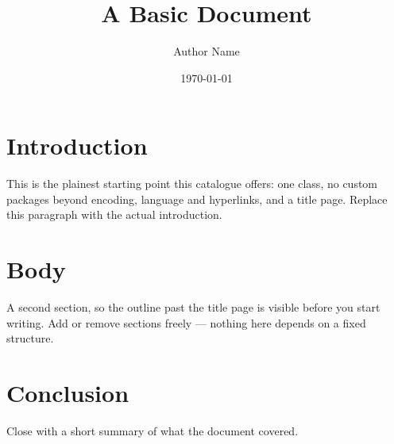 \documentclass[12pt, a4paper, titlepage]{article}
\title{A Basic Document}
\author{Author Name}
\date{\today}
\begin{document}
\maketitle

\section{Introduction}
This is the plainest starting point this catalogue offers: one class,
no custom packages beyond encoding, language and hyperlinks, and a
title page. Replace this paragraph with the actual introduction.

\section{Body}
A second section, so the outline past the title page is visible before
you start writing. Add or remove sections freely — nothing here
depends on a fixed structure.

\section{Conclusion}
Close with a short summary of what the document covered.
\end{document}

